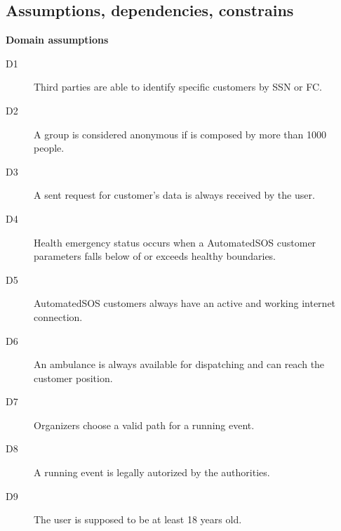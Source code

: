 \documentclass[../main.tex]{subfiles}
\begin{document}
\subsection{Assumptions, dependencies, constrains}

{\bf Domain assumptions}

\begin{description}

	\item [D1] Third parties are able to identify specific customers by SSN or FC.
	\item [D2] A group is considered anonymous if is composed by more than 1000 people.
	\item [D3] A sent request for customer's data is always received by the user.
	\item [D4] Health emergency status occurs when a AutomatedSOS customer parameters falls below of or exceeds healthy boundaries.
	\item [D5] AutomatedSOS customers always have an active and working internet connection.
	\item [D6] An ambulance is always available for dispatching and can reach the customer position.
	\item [D7] Organizers choose a valid path for a running event.
	\item [D8] A running event is legally autorized by the authorities.
	\item [D9] The user is supposed to be at least 18 years old.

\end{description}
\end{document}
